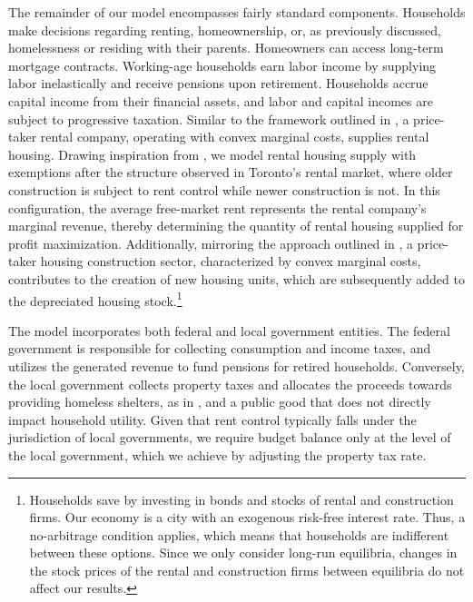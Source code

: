 \documentclass[parskip=full]{article}
\begin{document}
The remainder of our model encompasses fairly standard components. Households make decisions regarding renting, homeownership, or, as previously discussed, homelessness or residing with their parents. Homeowners can access long-term mortgage contracts. Working-age households earn labor income by supplying labor inelastically and receive pensions upon retirement. Households accrue capital income from their financial assets, and labor and capital incomes are subject to progressive taxation. Similar to the framework outlined in \citet{garrigaeetal-2009}, a price-taker rental company, operating with convex marginal costs, supplies rental housing. Drawing inspiration from \citet{fallis-1985}, we model rental housing supply with exemptions after the structure observed in Toronto's rental market, where older construction is subject to rent control while newer construction is not. In this configuration, the average free-market rent represents the rental company's marginal revenue, thereby determining the quantity of rental housing supplied for profit maximization. Additionally, mirroring the approach outlined in \citet{rotberg-2022}, a price-taker housing construction sector, characterized by convex marginal costs, contributes to the creation of new housing units, which are subsequently added to the depreciated housing stock.\footnote{Households save by investing in bonds and stocks of rental and construction firms. Our economy is a city with an exogenous risk-free interest rate. Thus, a no-arbitrage condition applies, which means that households are indifferent between these options. Since we only consider long-run equilibria, changes in the stock prices of the rental and construction firms between equilibria do not affect our results.}

The model incorporates both federal and local government entities. The federal government is responsible for collecting consumption and income taxes, and utilizes the generated revenue to fund pensions for retired households. Conversely, the local government collects property taxes and allocates the proceeds towards providing homeless shelters, as in \citet{abramson-2024}, and a public good that does not directly impact household utility. Given that rent control typically falls under the jurisdiction of local governments, we require budget balance only at the level of the local government, which we achieve by adjusting the property tax rate.
\end{document}
